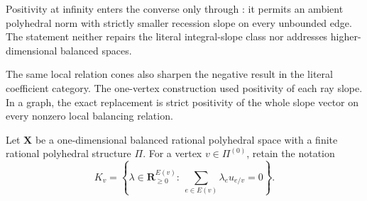 \documentclass[11pt,a4paper]{article}
\theoremstyle{definition}
\theoremstyle{remark}
\begin{document}
Positivity at infinity enters the converse only through
: it permits an
ambient polyhedral norm with strictly smaller recession slope on every
unbounded edge.  The statement neither repairs the literal integral-slope
class nor addresses higher-dimensional balanced spaces.










The same local relation cones also sharpen the negative result in the
literal coefficient category.  The one-vertex construction used positivity
of each ray slope.  In a graph, the exact replacement is strict positivity
of the whole slope vector on every nonzero local balancing relation.



Let $\mathbf X$ be a one-dimensional balanced rational polyhedral space
with a finite rational polyhedral structure $\Pi$.  For a vertex
$v\in\Pi^{(0)}$, retain the notation
\[
 K_v=\left\{\lambda\in\mathbf R_{\geq0}^{E(v)}:\
             \sum_{e\in E(v)}\lambda_eu_{e/v}=0\right\}.
\]
\end{document}
